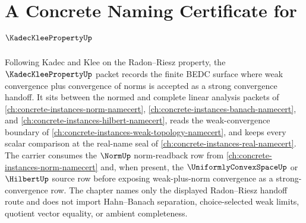 \chapter{A Concrete Naming Certificate for $\KadecKleePropertyUp$}
\label{ch:concrete-instances-kadec-klee-property-namecert}

Following Kadec and Klee on the Radon--Riesz property, the $\KadecKleePropertyUp$ packet records the finite BEDC surface where weak convergence plus convergence of norms is accepted as a strong convergence handoff. It sits between the normed and complete linear analysis packets of \autoref{ch:concrete-instances-norm-namecert}, \autoref{ch:concrete-instances-banach-namecert}, and \autoref{ch:concrete-instances-hilbert-namecert}, reads the weak-convergence boundary of \autoref{ch:concrete-instances-weak-topology-namecert}, and keeps every scalar comparison at the real-name seal of \autoref{ch:concrete-instances-real-namecert}. The carrier consumes the $\NormUp$ norm-readback row from \autoref{ch:concrete-instances-norm-namecert} and, when present, the $\UniformlyConvexSpaceUp$ or $\HilbertUp$ source row before exposing weak-plus-norm convergence as a strong-convergence row. The chapter names only the displayed Radon--Riesz handoff route and does not import Hahn--Banach separation, choice-selected weak limits, quotient vector equality, or ambient completeness.

